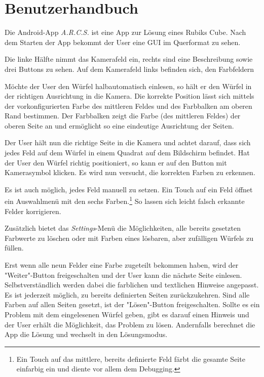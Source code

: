\section{Benutzerhandbuch}  %

Die Android-App \emph{A.R.C.S.} ist eine App zur Lösung eines Rubiks Cube.
Nach dem Starten der App bekommt der User eine GUI im Querformat zu sehen.

Die linke Hälfte nimmt das Kamerafeld ein, rechts sind eine Beschreibung sowie
drei Buttons zu sehen. Auf dem Kamerafeld links befinden sich, den Farbfeldern

Möchte der User den Würfel halbautomatisch einlesen, so hält er den Würfel in
der richtigen Ausrichtung in die Kamera. Die korrekte Position lässt sich
mittels der vorkonfigurierten Farbe des mittleren Feldes und des Farbbalken am
oberen Rand bestimmen. Der Farbbalken zeigt die Farbe (des mittleren
Feldes) der oberen Seite an und ermöglicht so eine eindeutige Ausrichtung der
Seiten.

Der User hält nun die richtige Seite in die Kamera und achtet darauf, dass sich
jedes Feld auf dem Würfel in einem Quadrat auf dem Bildschirm befindet. Hat der
User den Würfel richtig positioniert, so kann er auf den Button mit Kamerasymbol
klicken. Es wird nun versucht, die korrekten Farben zu erkennen. 

Es ist auch möglich, jedes Feld manuell zu setzen. Ein Touch auf ein Feld öffnet
ein Auswahlmenü mit den sechs Farben.\footnote{Ein Touch auf das mittlere, bereits
definierte Feld färbt die gesamte Seite einfarbig ein und diente vor allem dem
Debugging.} So lassen sich leicht falsch erkannte Felder korrigieren.

Zusätzlich bietet das \emph{Settings}-Menü die Möglichkeiten, alle bereits
gesetzten Farbwerte zu löschen oder mit Farben eines lösbaren, aber zufälligen
Würfels zu füllen.

Erst wenn alle neun Felder eine Farbe zugeteilt bekommen haben, wird der
"Weiter"-Button freigeschalten und der User kann die nächste Seite einlesen.
Selbstverständlich werden dabei die farblichen und textlichen Hinweise
angepasst. Es ist jederzeit möglich, zu bereits definierten Seiten
zurückzukehren. Sind alle Farben auf allen Seiten gesetzt, ist der
"Lösen"-Button freigeschalten. Sollte es ein Problem mit dem eingelesenen Würfel
geben, gibt es darauf einen Hinweis und der User erhält die Möglichkeit, das
Problem zu lösen. Andernfalls berechnet die App die Lösung und wechselt in den
Lösungsmodus.

